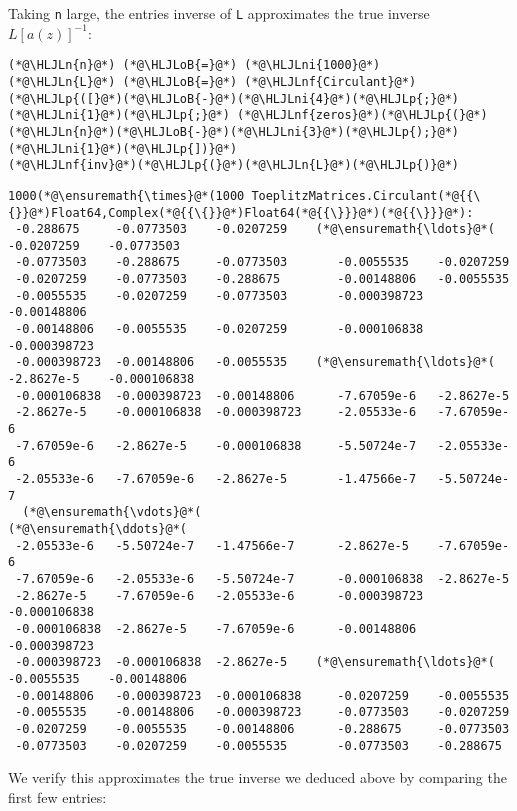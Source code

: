 \documentclass[12pt,a4paper]{article}
\newcommand{\HLJLn}[1]{#1}
\newcommand{\HLJLnf}[1]{\textcolor[RGB]{66,102,213}{#1}}
\newcommand{\HLJLni}[1]{\textcolor[RGB]{59,151,46}{#1}}
\newcommand{\HLJLoB}[1]{\textcolor[RGB]{102,102,102}{\textbf{#1}}}
\newcommand{\HLJLp}[1]{#1}
\begin{document}
Taking \texttt{n} large, the entries inverse of \texttt{L} approximates the true inverse $L[a(z)]^{-1}$:


\begin{lstlisting}
(*@\HLJLn{n}@*) (*@\HLJLoB{=}@*) (*@\HLJLni{1000}@*)
(*@\HLJLn{L}@*) (*@\HLJLoB{=}@*) (*@\HLJLnf{Circulant}@*)(*@\HLJLp{([}@*)(*@\HLJLoB{-}@*)(*@\HLJLni{4}@*)(*@\HLJLp{;}@*) (*@\HLJLni{1}@*)(*@\HLJLp{;}@*) (*@\HLJLnf{zeros}@*)(*@\HLJLp{(}@*)(*@\HLJLn{n}@*)(*@\HLJLoB{-}@*)(*@\HLJLni{3}@*)(*@\HLJLp{);}@*) (*@\HLJLni{1}@*)(*@\HLJLp{])}@*)
(*@\HLJLnf{inv}@*)(*@\HLJLp{(}@*)(*@\HLJLn{L}@*)(*@\HLJLp{)}@*)
\end{lstlisting}

\begin{lstlisting}
1000(*@\ensuremath{\times}@*(1000 ToeplitzMatrices.Circulant(*@{{\{}}@*)Float64,Complex(*@{{\{}}@*)Float64(*@{{\}}}@*)(*@{{\}}}@*):
 -0.288675     -0.0773503    -0.0207259    (*@\ensuremath{\ldots}@*(  -0.0207259    -0.0773503
 -0.0773503    -0.288675     -0.0773503       -0.0055535    -0.0207259
 -0.0207259    -0.0773503    -0.288675        -0.00148806   -0.0055535
 -0.0055535    -0.0207259    -0.0773503       -0.000398723  -0.00148806
 -0.00148806   -0.0055535    -0.0207259       -0.000106838  -0.000398723
 -0.000398723  -0.00148806   -0.0055535    (*@\ensuremath{\ldots}@*(  -2.8627e-5    -0.000106838
 -0.000106838  -0.000398723  -0.00148806      -7.67059e-6   -2.8627e-5
 -2.8627e-5    -0.000106838  -0.000398723     -2.05533e-6   -7.67059e-6
 -7.67059e-6   -2.8627e-5    -0.000106838     -5.50724e-7   -2.05533e-6
 -2.05533e-6   -7.67059e-6   -2.8627e-5       -1.47566e-7   -5.50724e-7
  (*@\ensuremath{\vdots}@*(                                        (*@\ensuremath{\ddots}@*(                
 -2.05533e-6   -5.50724e-7   -1.47566e-7      -2.8627e-5    -7.67059e-6
 -7.67059e-6   -2.05533e-6   -5.50724e-7      -0.000106838  -2.8627e-5
 -2.8627e-5    -7.67059e-6   -2.05533e-6      -0.000398723  -0.000106838
 -0.000106838  -2.8627e-5    -7.67059e-6      -0.00148806   -0.000398723
 -0.000398723  -0.000106838  -2.8627e-5    (*@\ensuremath{\ldots}@*(  -0.0055535    -0.00148806
 -0.00148806   -0.000398723  -0.000106838     -0.0207259    -0.0055535
 -0.0055535    -0.00148806   -0.000398723     -0.0773503    -0.0207259
 -0.0207259    -0.0055535    -0.00148806      -0.288675     -0.0773503
 -0.0773503    -0.0207259    -0.0055535       -0.0773503    -0.288675
\end{lstlisting}


We verify this approximates the true inverse we deduced above by comparing the first few entries:
\end{document}
